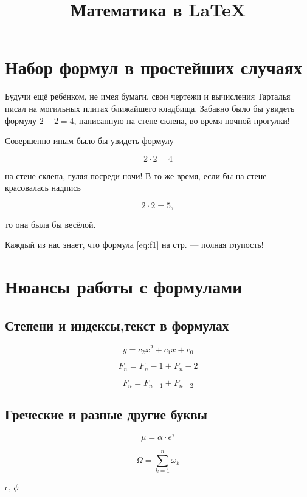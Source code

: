 \documentclass[12pt, a4paper]{article}
\title{Математика в \LaTeX}
\begin{document}

\maketitle

\section{Набор формул в простейших случаях}

Будучи ещё ребёнком, не имея бумаги, свои чертежи и вычисления Тарталья писал на  могильных плитах ближайшего кладбища. Забавно было бы увидеть формулу $2 + 2 = 4$, написанную на стене склепа, во время ночной прогулки!

Совершенно иным было бы увидеть формулу 

\[2 \cdot 2 = 4\]

на стене склепа, гуляя посреди ночи! В то же время, если бы на стене красовалась надпись 

\begin{equation}\label{eq:f1}
2 \cdot 2 = 5,
\end{equation}

то она была бы весёлой.

Каждый из нас знает, что формула \eqref{eq:f1}  на стр. \pageref{eq:f1} --- полная глупость!


\section{Нюансы работы с формулами}

\subsection{Степени и индексы,текст в формулах}

\[ y = c_2 x^2 + c_1 x + c_0 \] 

\[ F_n = F_n-1 + F_n-2 \]  %

\[ F_n = F_{n-1} + F_{n-2} \] %


\subsection{Греческие и разные другие буквы}

\[ \mu = \alpha \cdot e^{\tau} \]

\[ \Omega = \sum_{k=1}^{n} \omega_k \]


$\epsilon$, $\phi$
\end{document}
